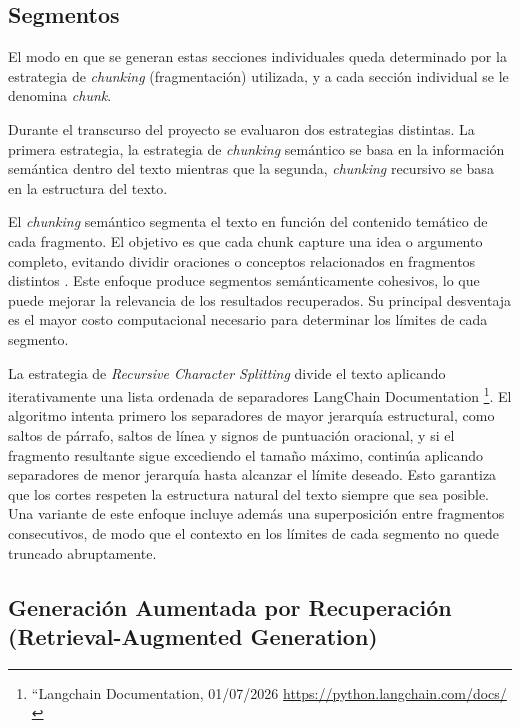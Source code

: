 \subsection{Segmentos}
\label{subsection:2-Segmentos}


El modo en que se generan estas secciones individuales queda determinado por la estrategia de \textit{chunking} (fragmentación) utilizada, y a cada sección individual se le denomina \textit{\gls{chunk}}.

Durante el transcurso del proyecto se evaluaron dos estrategias distintas. La primera estrategia, la estrategia de \textit{chunking} semántico se basa en la información semántica dentro del texto mientras que la segunda, \textit{chunking} recursivo se basa en la estructura del texto. 

El \textit{chunking} semántico segmenta el texto en función del contenido temático de cada fragmento. El objetivo es que cada chunk capture una idea o argumento completo, evitando dividir oraciones o conceptos relacionados en fragmentos distintos \cite{gao2023retrieval}. Este enfoque produce segmentos semánticamente cohesivos, lo que puede mejorar la relevancia de los resultados recuperados. Su principal desventaja es el mayor costo computacional necesario para determinar los límites de cada segmento.

La estrategia de \textit{Recursive Character Splitting} divide el texto aplicando iterativamente una lista ordenada de separadores LangChain Documentation \footnote{``Langchain Documentation, 01/07/2026 \url{https://python.langchain.com/docs/}}. El algoritmo intenta primero los separadores de mayor jerarquía estructural, como saltos de párrafo, saltos de línea y signos de puntuación oracional, y si el fragmento resultante sigue excediendo el tamaño máximo, continúa aplicando separadores de menor jerarquía hasta alcanzar el límite deseado. Esto garantiza que los cortes respeten la estructura natural del texto siempre que sea posible. Una variante de este enfoque incluye además una superposición entre fragmentos consecutivos, de modo que el contexto en los límites de cada segmento no quede truncado abruptamente.



\subsection[Retrieval-Augmented Generation]{Generación Aumentada por Recuperación (Retrieval-Augmented Generation)}
\label{subsection:2-Retrieval-Augmented Generation}

